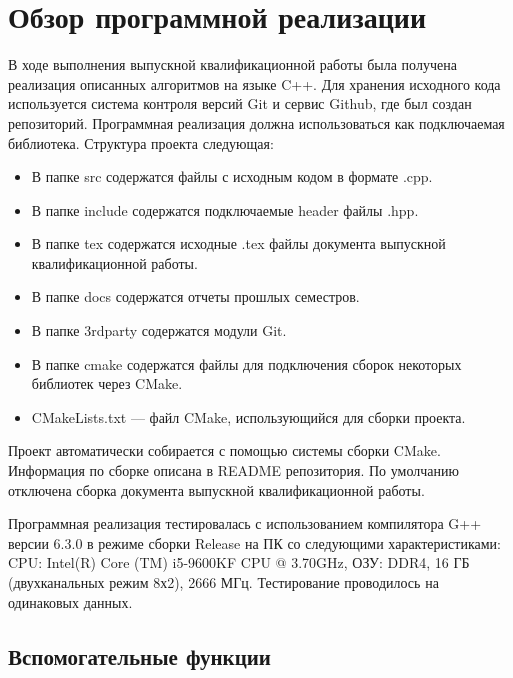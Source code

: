 \newpage

\section{Обзор программной реализации}

В ходе выполнения выпускной квалификационной работы была получена реализация описанных алгоритмов на языке C++. Для хранения исходного кода используется система контроля версий Git и сервис Github, где был создан репозиторий\cite{Repository}. Программная реализация должна использоваться как подключаемая библиотека. Структура проекта следующая:
\begin{itemize}

\item В папке src содержатся файлы с исходным кодом в формате .cpp.

\item В папке include содержатся подключаемые header файлы .hpp.

\item В папке tex содержатся исходные .tex файлы документа выпускной квалификационной работы.

\item В папке docs содержатся отчеты прошлых семестров.

\item В папке 3rdparty содержатся модули Git.

\item В папке cmake содержатся файлы для подключения сборок некоторых библиотек через CMake.

\item CMakeLists.txt --- файл CMake, использующийся для сборки проекта.

\end{itemize}

Проект автоматически собирается с помощью системы сборки CMake. Информация по сборке описана в README репозитория. По умолчанию отключена сборка документа выпускной квалификационной работы.

Программная реализация тестировалась с использованием компилятора G++ версии 6.3.0 в режиме сборки Release на ПК со следующими характеристиками: CPU: Intel(R) Core (TM) i5-9600KF CPU @ 3.70GHz, ОЗУ: DDR4, 16 ГБ (двухканальных режим 8х2), 2666 МГц. Тестирование проводилось на одинаковых данных.

\subsection{Вспомогательные функции}

